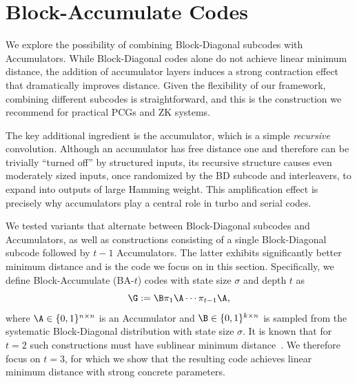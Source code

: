 
\section{Block-Accumulate Codes}\label{sec:BDA}

We explore the possibility of combining Block-Diagonal subcodes with Accumulators. While Block-Diagonal codes alone do not achieve linear minimum distance, the addition of accumulator layers induces a strong contraction effect that dramatically improves distance. Given the flexibility of our framework, combining different subcodes is straightforward, and this is the construction we recommend for practical PCGs and ZK systems.

The key additional ingredient is the accumulator, which is a simple \emph{recursive} convolution. Although an accumulator has free distance one and therefore can be trivially ``turned off'' by structured inputs, its recursive structure causes even moderately sized inputs, once randomized by the BD subcode and interleavers, to expand into outputs of large Hamming weight. This amplification effect is precisely why accumulators play a central role in turbo and serial codes.

We tested variants that alternate between Block-Diagonal subcodes and Accumulators, as well as constructions consisting of a single Block-Diagonal subcode followed by $t-1$ Accumulators. The latter exhibits significantly better minimum distance and is the code we focus on in this section.
Specifically, we define Block-Accumulate (BA-$t$) codes with state size $\sigma$ and depth $t$ as
$$
\G := \B \pi_1 \A \cdots \pi_{t-1} \A,
$$
where $\A\in\{0,1\}^{n\times n}$ is an Accumulator and $\B\in\{0,1\}^{k\times n}$ is sampled from the systematic Block-Diagonal distribution with state size $\sigma$.
It is known that for $t=2$ such constructions must have sublinear minimum distance~\cite{spielman}.
We therefore focus on $t=3$, for which we show that the resulting code achieves linear minimum distance with strong concrete parameters.



